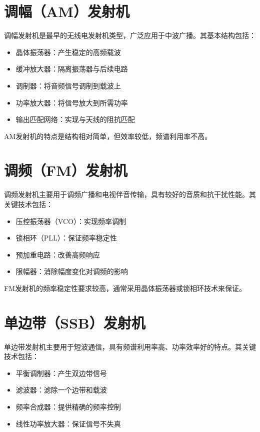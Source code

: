\documentclass[12pt,UTF8]{ctexbook}
\begin{document}
\section{调幅（AM）发射机}

调幅发射机是最早的无线电发射机类型，广泛应用于中波广播。其基本结构包括：

\begin{itemize}[leftmargin=3.5em]
    \item 晶体振荡器：产生稳定的高频载波
    \item 缓冲放大器：隔离振荡器与后续电路
    \item 调制器：将音频信号调制到载波上
    \item 功率放大器：将信号放大到所需功率
    \item 输出匹配网络：实现与天线的阻抗匹配
\end{itemize}

AM发射机的特点是结构相对简单，但效率较低，频谱利用率不高。

\section{调频（FM）发射机}

调频发射机主要用于调频广播和电视伴音传输，具有较好的音质和抗干扰性能。其关键技术包括：

\begin{itemize}[leftmargin=3.5em]
    \item 压控振荡器（VCO）：实现频率调制
    \item 锁相环（PLL）：保证频率稳定性
    \item 预加重电路：改善高频响应
    \item 限幅器：消除幅度变化对调频的影响
\end{itemize}

FM发射机的频率稳定性要求较高，通常采用晶体振荡器或锁相环技术来保证。

\section{单边带（SSB）发射机}

单边带发射机主要用于短波通信，具有频谱利用率高、功率效率好的特点。其关键技术包括：

\begin{itemize}[leftmargin=3.5em]
    \item 平衡调制器：产生双边带信号
    \item 滤波器：滤除一个边带和载波
    \item 频率合成器：提供精确的频率控制
    \item 线性功率放大器：保证信号不失真
\end{itemize}
\end{document}

